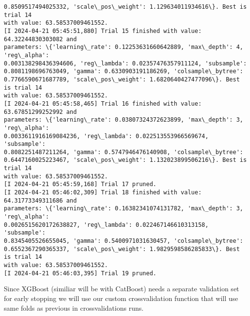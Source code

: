 \documentclass[11pt]{article}
\begin{document}
\begin{Verbatim}[commandchars=\\\{\}]
0.8509517494025332, 'scale\_pos\_weight': 1.129634011934616\}. Best is trial 14
with value: 63.58537009461552.
[I 2024-04-21 05:45:51,880] Trial 15 finished with value: 64.32244830303082 and
parameters: \{'learning\_rate': 0.12253631660642889, 'max\_depth': 4, 'reg\_alpha':
0.003138298436394606, 'reg\_lambda': 0.02357476357911124, 'subsample':
0.8081198696763049, 'gamma': 0.6330903191186269, 'colsample\_bytree':
0.7766590671687789, 'scale\_pos\_weight': 1.6820640427477096\}. Best is trial 14
with value: 63.58537009461552.
[I 2024-04-21 05:45:58,465] Trial 16 finished with value: 63.67851299252992 and
parameters: \{'learning\_rate': 0.03807324372623899, 'max\_depth': 3, 'reg\_alpha':
0.0033611916169084236, 'reg\_lambda': 0.022513553966569674, 'subsample':
0.8082251487211264, 'gamma': 0.5747946476140908, 'colsample\_bytree':
0.6447160025223467, 'scale\_pos\_weight': 1.132023899506216\}. Best is trial 14
with value: 63.58537009461552.
[I 2024-04-21 05:45:59,168] Trial 17 pruned.
[I 2024-04-21 05:46:02,309] Trial 18 finished with value: 64.31773349311686 and
parameters: \{'learning\_rate': 0.16382341074131782, 'max\_depth': 3, 'reg\_alpha':
0.0026515620172638827, 'reg\_lambda': 0.022467146610313158, 'subsample':
0.8345405526655045, 'gamma': 0.5400971031630457, 'colsample\_bytree':
0.6552367290365337, 'scale\_pos\_weight': 1.9829598586285833\}. Best is trial 14
with value: 63.58537009461552.
[I 2024-04-21 05:46:03,395] Trial 19 pruned.
    \end{Verbatim}

    Since XGBoost (similiar will be with CatBoost) needs a separate
validation set for early stopping we will use our custom crossvalidation
function that will use same folds as previous in crossvalidations runs.
\end{document}
